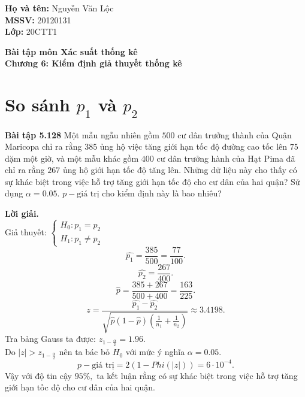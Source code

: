 \documentclass[12pt,a4paper]{article}
\author{Nguyễn Văn Lộc}
\begin{document}
    \fancyhf{}
    \lhead{}
    \chead{}
    \rhead{}
    \cfoot{}
    \rfoot{\thepage}
    \lfoot{}
    \pagestyle{fancy}
    \renewcommand{\headrulewidth}{0pt}
    \renewcommand{\footrulewidth}{0pt}
    \begin{mybox}
    \textbf{Họ và tên:} Nguyễn Văn Lộc\\
    \textbf{MSSV:} 20120131\\
    \textbf{Lớp:} 20CTT1
    \end{mybox}
    \begin{center}
    \fontsize{16}{14}\selectfont
    \textbf{Bài tập môn Xác suất thống kê}\\
    \textbf{Chương 6: Kiểm định giả thuyết thống kê}
    \end{center}
    



\section{So sánh $p_1$ và $p_2$}
\begin{mybox}
\textbf{Bài tập 5.128} Một mẫu ngẫu nhiên gồm $500$ cư dân trưởng thành của Quận Maricopa chỉ ra rằng $385$ ủng hộ việc tăng giới hạn tốc độ đường cao tốc lên $75$ dặm một giờ, và một mẫu khác gồm $400$ cư dân trưởng hành của Hạt Pima đã chỉ ra rằng $267$ ủng hộ giới hạn tốc độ tăng lên. Những dữ liệu này cho thấy có sự khác biệt trong việc hỗ trợ tăng giới hạn tốc độ cho cư dân của hai quận? Sử dụng $\alpha = 0.05.$ $p-\text{giá trị}$ cho kiểm định này là bao nhiêu?
\end{mybox}
\textbf{Lời giải.}\\
Giả thuyết: $\begin{cases}
H_0: p_1 = p_2\\
H_1: p_1 \ne p_2
\end{cases}$\\
$$\widehat{p_1} = \frac{385}{500} = \frac{77}{100}.$$
$$\widehat{p_2} = \frac{267}{400}.$$
$$\widehat{p} = \frac{385 + 267}{500 + 400} = \frac{163}{225}.$$
$$z = \frac{{\widehat {{p_1}} - \widehat {{p_2}}}}{{\sqrt {\widehat p\left( {1 - \widehat p} \right)\left( {\frac{1}{{{n_1}}} + \frac{1}{{{n_2}}}} \right)} }} \approx 3.4198.$$
Tra bảng Gauss ta được: $z_{1 - \frac{\alpha}{2}} = 1.96.$\\
Do $\left| z \right| > z_{1 - \frac{\alpha}{2}}$ nên ta bác bỏ $H_0$ với mức ý nghĩa $\alpha = 0.05.$
$$p-\text{giá trị} = 2 \left( {1 - Phi \left( {\left| z \right|} \right)} \right) = 6 \cdot 10^{-4}.$$
Vậy với độ tin cậy $95\%,$ ta kết luận rằng có sự khác biệt trong việc hỗ trợ tăng giới hạn tốc độ cho cư dân của hai quận.






%
\end{document}

